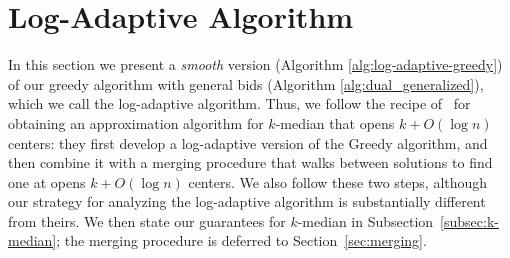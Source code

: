 
\section{Log-Adaptive Algorithm}
\label{sec:logad}


In this section we present a \textit{smooth} version (Algorithm \ref{alg:log-adaptive-greedy}) of our greedy algorithm with general bids (Algorithm \ref{alg:dual_generalized}), which we call the log-adaptive algorithm.
Thus, we follow the recipe of~\cite{MR4928455-Cohen25} for obtaining an approximation algorithm for $k$-median that opens $k + O(\log n)$ centers: they first develop a log-adaptive version of the Greedy algorithm, and then combine it with a merging procedure that walks between solutions to find one at opens $k + O(\log n)$ centers.
We also follow these two steps, although our strategy for analyzing the log-adaptive algorithm is substantially different from theirs.
We then state our guarantees for $k$-median in Subsection~\ref{subsec:k-median}; the merging procedure is deferred to Section~\ref{sec:merging}.



